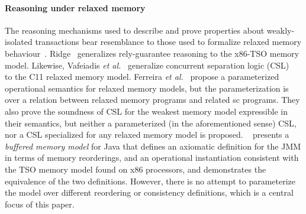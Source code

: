 \paragraph{Reasoning under relaxed memory} The reasoning mechanisms
used to describe and prove properties about weakly-isolated
transactions bear resemblance to those used to formalize relaxed
memory behaviour~\cite{battycpp}.  Ridge~\cite{rgtso} generalizes
rely-guarantee reasoning to the x86-TSO memory model.  Likewise,
Vafeiadis \emph{et al.}~\cite{rsl13} generalize concurrent separation
logic (CSL)~\cite{csl} to the C11 relaxed memory model.  Ferreira
\emph{et al.}~\cite{ferreira10} propose a parameterized operational
semantics for relaxed memory models, but the parameterization is over
a relation between relaxed memory programs and related {\sc sc}
programs. They also prove the soundness of CSL for the weakest memory
model expressible in their semantics, but neither a parameterized (in
the aforementioned sense) CSL, nor a CSL specialized for any relaxed
memory model is proposed.  ~\cite{DLZ+13} presents a \emph{buffered
  memory model} for Java that defines an axiomatic definition for the
JMM in terms of memory reorderings, and an operational instantiation
consistent with the TSO memory model found on x86 processors, and
demonstrates the equivalence of the two definitions.  However, there
is no attempt to parameterize the model over different reordering or
consistency definitions, which is a central focus of this paper.

